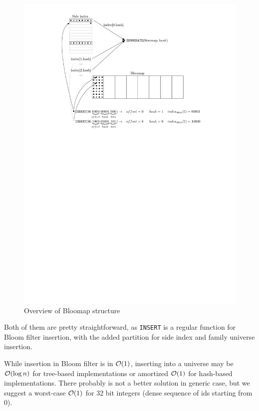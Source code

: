 \begin{figure}[!ht]
\centering
	\includegraphics{./img/bloomap_overview.pdf}
	\caption{Overview of Bloomap structure}
	\label{figure-bloomap-overview}
\end{figure}



Both of them are pretty straightforward, as {\tt INSERT} is a regular function
for Bloom filter insertion, with the added partition for side index and family
universe insertion.

While insertion in Bloom filter is in $\mathcal{O}(1)$, inserting into a universe may be
$\mathcal{O}(\log n)$ for tree-based implementations or amortized $\mathcal{O}(1)$ for hash-based
implementations. There probably is not a better solution in generic case,
but we suggest a worst-case $\mathcal{O}(1)$ for 32 bit integers (dense sequence of
ids starting from 0).


